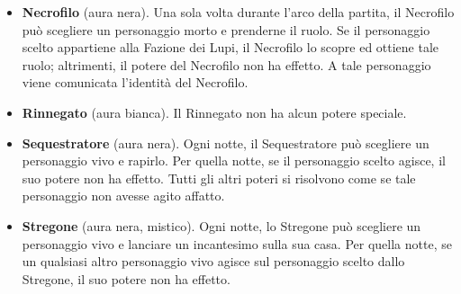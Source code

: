 \documentclass[a4paper,10pt]{article}
\begin{document}
\begin{itemize}
	\item {\bf Necrofilo} (aura nera). Una sola volta durante l'arco della partita, il Necrofilo può scegliere un personaggio morto e prenderne il ruolo. Se il personaggio scelto appartiene alla Fazione dei Lupi, il Necrofilo lo scopre ed ottiene tale ruolo; altrimenti, il potere del Necrofilo non ha effetto. A tale personaggio viene comunicata l'identità del Necrofilo.
  
	\item {\bf Rinnegato} (aura bianca). Il Rinnegato non ha alcun potere speciale.

	\item {\bf Sequestratore} (aura nera). Ogni notte, il Sequestratore può scegliere un personaggio vivo e rapirlo. Per quella notte, se il personaggio scelto agisce, il suo potere non ha effetto. Tutti gli altri poteri si risolvono come se tale personaggio non avesse agito affatto. %
	

	\item {\bf Stregone} (aura nera, mistico). Ogni notte, lo Stregone può scegliere un personaggio vivo e lanciare un incantesimo sulla sua casa. Per quella notte, se un qualsiasi altro personaggio vivo agisce sul personaggio scelto dallo Stregone, il suo potere non ha effetto.
 
 
\end{itemize}
\end{document}
